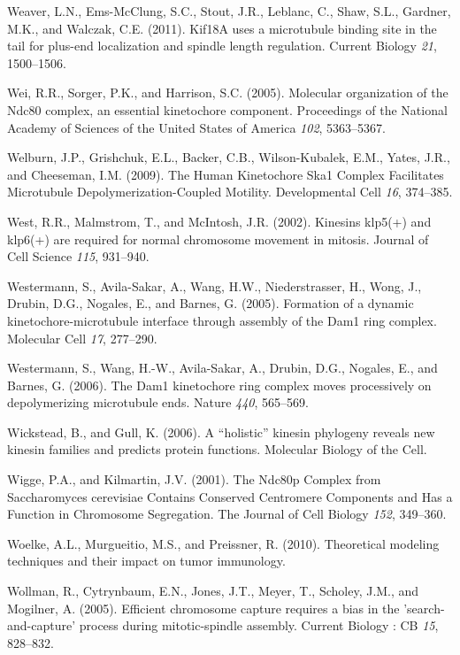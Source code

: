 \documentclass[12pt,a4paper,twoside,openright]{book}
\begin{document}
\hypertarget{ref-Weaver2011}{}
Weaver, L.N., Ems-McClung, S.C., Stout, J.R., Leblanc, C., Shaw, S.L.,
Gardner, M.K., and Walczak, C.E. (2011). Kif18A uses a microtubule
binding site in the tail for plus-end localization and spindle length
regulation. Current Biology \emph{21}, 1500--1506.

\hypertarget{ref-Wei2005}{}
Wei, R.R., Sorger, P.K., and Harrison, S.C. (2005). Molecular
organization of the Ndc80 complex, an essential kinetochore component.
Proceedings of the National Academy of Sciences of the United States of
America \emph{102}, 5363--5367.

\hypertarget{ref-Welburn2009}{}
Welburn, J.P., Grishchuk, E.L., Backer, C.B., Wilson-Kubalek, E.M.,
Yates, J.R., and Cheeseman, I.M. (2009). The Human Kinetochore Ska1
Complex Facilitates Microtubule Depolymerization-Coupled Motility.
Developmental Cell \emph{16}, 374--385.

\hypertarget{ref-West2002}{}
West, R.R., Malmstrom, T., and McIntosh, J.R. (2002). Kinesins klp5(+)
and klp6(+) are required for normal chromosome movement in mitosis.
Journal of Cell Science \emph{115}, 931--940.

\hypertarget{ref-Westermann2005}{}
Westermann, S., Avila-Sakar, A., Wang, H.W., Niederstrasser, H., Wong,
J., Drubin, D.G., Nogales, E., and Barnes, G. (2005). Formation of a
dynamic kinetochore-microtubule interface through assembly of the Dam1
ring complex. Molecular Cell \emph{17}, 277--290.

\hypertarget{ref-Westermann2006}{}
Westermann, S., Wang, H.-W., Avila-Sakar, A., Drubin, D.G., Nogales, E.,
and Barnes, G. (2006). The Dam1 kinetochore ring complex moves
processively on depolymerizing microtubule ends. Nature \emph{440},
565--569.

\hypertarget{ref-Wickstead2006}{}
Wickstead, B., and Gull, K. (2006). A ``holistic'' kinesin phylogeny
reveals new kinesin families and predicts protein functions. Molecular
Biology of the Cell.

\hypertarget{ref-Wigge2001}{}
Wigge, P.A., and Kilmartin, J.V. (2001). The Ndc80p Complex from
Saccharomyces cerevisiae Contains Conserved Centromere Components and
Has a Function in Chromosome Segregation. The Journal of Cell Biology
\emph{152}, 349--360.

\hypertarget{ref-Woelke2010}{}
Woelke, A.L., Murgueitio, M.S., and Preissner, R. (2010). Theoretical
modeling techniques and their impact on tumor immunology.

\hypertarget{ref-Wollman2005}{}
Wollman, R., Cytrynbaum, E.N., Jones, J.T., Meyer, T., Scholey, J.M.,
and Mogilner, A. (2005). Efficient chromosome capture requires a bias in
the 'search-and-capture' process during mitotic-spindle assembly.
Current Biology : CB \emph{15}, 828--832.
\end{document}
